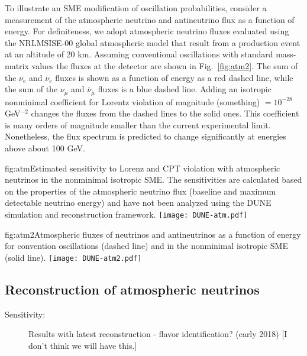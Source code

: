 To illustrate an SME modification of oscillation probabilities,
consider a measurement of the atmospheric neutrino and antineutrino flux
as a function of energy.
For definiteness,
we adopt atmospheric neutrino fluxes 
evaluated using the NRLMSISE-00 global atmospheric model
that result from a production event at an altitude of 20 km.
Assuming conventional oscillations with standard mass-matrix values 
the fluxes at the detector are shown in Fig.\ \ref{fig:atm2}.
The sum of the $\nu_e$ and $\overline\nu_e$ fluxes
is shown as a function of energy as a red dashed line, 
while the sum of the $\nu_\mu$ and $\overline\nu_\mu$ fluxes 
is a blue dashed line. 
Adding an isotropic nonminimal coefficient for Lorentz violation
of magnitude %
(something) $= 10^{-28}$ GeV$^{-2}$
changes the fluxes from the dashed lines to the solid ones.
This coefficient is many orders of magnitude smaller
than the current experimental limit.
Nonetheless,
the flux spectrum is predicted to change significantly 
at energies above about 100 GeV. 

\begin{dunefigure}{fig:atm}{Estimated sensitivity to Lorenz and CPT violation with atmospheric neutrinos in the nonminimal isotropic SME.  The sensitivities are calculated based on the properties of the atmospheric neutrino flux (baseline and maximum detectable neutrino energy) and have not been analyzed using the DUNE simulation and reconstruction framework.}
\texttt{[image: DUNE-atm.pdf]}
\end{dunefigure}

\begin{dunefigure}{fig:atm2}{Atmospheric fluxes of neutrinos and antineutrinos as a function of energy for convention oscillations (dashed line) and in the nonminimal isotropic SME (solid line).}
\texttt{[image: DUNE-atm2.pdf]}
\end{dunefigure}


\subsection{Reconstruction of atmospheric neutrinos}
\label{sec:nonaccel-atm-reco}

\begin{description}
\item[Sensitivity:] Results with latest reconstruction - flavor identification?  (early 2018) [I don't think we will have this.]
\end{description}